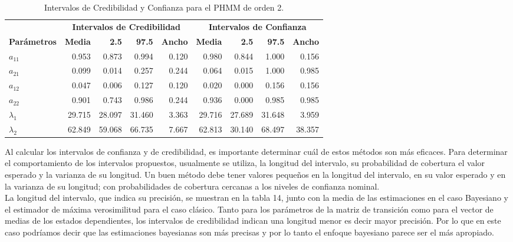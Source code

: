 \documentclass[a4paper]{article}\usepackage[]{graphicx}\usepackage[]{color}
\begin{document}
\begin{table}[ht]
\centering
\begin{tabular}{lrrrrrrrr}
  \toprule
   & \multicolumn{4}{c}{\textbf{Intervalos de Credibilidad}} & \multicolumn{4}{c}{\textbf{Intervalos de Confianza}}\\
 \cmidrule(lr){2-5}\cmidrule(lr){6-9}
 \textbf{Parámetros} & \textbf{Media} & \textbf{2.5} & \textbf{97.5} & \textbf{Ancho} & \textbf{Media} & \textbf{2.5} & \textbf{97.5} & \textbf{Ancho}\\
 \midrule
$a_{11}$ & 0.953 & 0.873 & 0.994 & 0.120 & 0.980 & 0.844 & 1.000 & 0.156 \\ 
  $a_{21}$ & 0.099 & 0.014 & 0.257 & 0.244 & 0.064 & 0.015 & 1.000 & 0.985 \\ 
  $a_{12}$ & 0.047 & 0.006 & 0.127 & 0.120 & 0.020 & 0.000 & 0.156 & 0.156 \\ 
  $a_{22}$ & 0.901 & 0.743 & 0.986 & 0.244 & 0.936 & 0.000 & 0.985 & 0.985 \\ 
  $\lambda_1$ & 29.715 & 28.097 & 31.460 & 3.363 & 29.716 & 27.689 & 31.648 & 3.959 \\ 
  $\lambda_2$ & 62.849 & 59.068 & 66.735 & 7.667 & 62.813 & 30.140 & 68.497 & 38.357 \\ 
   \bottomrule
\end{tabular}
\caption{Intervalos de Credibilidad y Confianza para el PHMM de orden 2.} 
\end{table}


Al calcular los intervalos de confianza y de credibilidad, es importante determinar cuál de estos métodos son más eficaces. Para determinar el comportamiento de los intervalos propuestos, usualmente se utiliza, la longitud del intervalo, su probabilidad de cobertura el valor esperado y la varianza de su longitud. Un buen método debe tener valores pequeños en la longitud del intervalo, en su valor esperado y en la varianza de su longitud; con probabilidades de cobertura cercanas a los niveles de confianza nominal.
\\
La longitud del intervalo, que indica su precisión, se muestran en la tabla 14, junto con la media de las estimaciones en el caso Bayesiano y el estimador de máxima verosimilitud para el caso clásico. Tanto para los parámetros de la matriz de transición como para el vector de medias de los estados dependientes, los intervalos de credibilidad indican una longitud menor es decir mayor precisión. Por lo que en este caso podríamos decir que las estimaciones bayesianas son más precisas y por lo tanto el enfoque bayesiano parece ser el más apropiado.  
\end{document}
